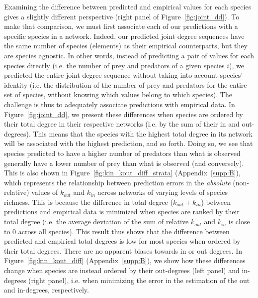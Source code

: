 Examining the difference between predicted and empirical values for each species
gives a slightly different perspective (right panel of Figure~\ref{fig:joint_dd}).
To make that comparison, we must first associate each of our predictions with a
specific species in a network. Indeed, our predicted joint degree sequences have
the same number of species (elements) as their empirical counterparts, but they
are species agnostic. In other words, instead of predicting a pair of values for
each species directly (i.e. the number of prey and predators of a given species
$i$), we predicted the entire joint degree sequence without taking into account
species' identity (i.e. the distribution of the number of prey and predators for
the entire set of species, without knowing which values belong to which
species). The challenge is thus to adequately associate predictions with
empirical data. In Figure~\ref{fig:joint_dd}, we present these differences when
species are ordered by their total degree in their respective networks (i.e. by
the sum of their in and out-degrees). This means that the species with the
highest total degree in its network will be associated with the highest
prediction, and so forth. Doing so, we see that species predicted to have a
higher number of predators than what is observed generally have a lower number
of prey than what is observed (and conversely). This is also shown in
Figure~\ref{fig:kin_kout_diff_strata} (Appendix~\ref{supp:B}), which represents the
relationship between prediction errors in the \textit{absolute} (non-relative)
values of $k_{out}$ and $k_{in}$ across networks of varying levels of species
richness. This is because the difference in total degree ($k_{out} + k_{in}$)
between predictions and empirical data is minimized when species are ranked by
their total degree (i.e. the average deviation of the sum of relative $k_{out}$
and $k_{in}$ is close to $0$ across all species). This result thus shows that
the difference between predicted and empirical total degrees is low for most
species when ordered by their total degrees. There are no apparent biases
towards in or out degrees. In Figure~\ref{fig:kin_kout_diff}
(Appendix~\ref{supp:B}), we show how these differences change when species are
instead ordered by their out-degrees (left panel) and in-degrees (right panel),
i.e. when minimizing the error in the estimation of the out and in-degrees,
respectively.

